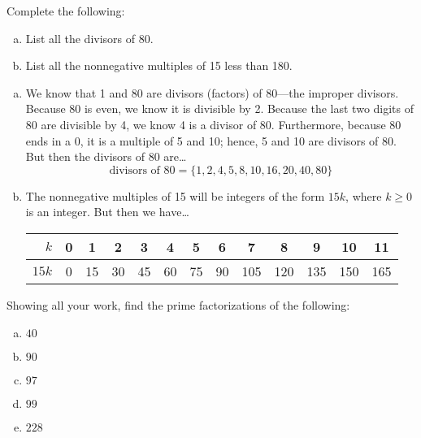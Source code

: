 \documentclass[11pt,letterpaper]{article}
\begin{document}

 Complete the following:
	\begin{enumerate}[(a)]
	\item List all the divisors of 80.
	\item List all the nonnegative multiples of 15 less than 180. 
	\end{enumerate} \pspace

\sol 
\begin{enumerate}[(a)]
\item We know that 1 and 80 are divisors (factors) of 80---the improper divisors. Because 80 is even, we know it is divisible by 2. Because the last two digits of 80 are divisible by 4, we know 4 is a divisor of 80. Furthermore, because 80 ends in a 0, it is a multiple of 5 and 10; hence, 5 and 10 are divisors of 80. But then the divisors of 80 are\dots
	\[
	\text{divisors of 80}= \{ 1, 2, 4, 5, 8, 10, 16, 20, 40, 80 \}
	\] \pspace

\item The nonnegative multiples of 15 will be integers of the form $15k$, where $k \geq 0$ is an integer. But then we have\dots \par
	\begin{table}[h]
	\centering
	\begin{tabular}{r|cccccccccccc}
	$k$ & 0 & 1 & 2 & 3 & 4 & 5 & 6 & 7 & 8 & 9 & 10 & 11 \\ \hline
	$15k$ & 0 & 15 & 30 & 45 & 60 & 75 & 90 & 105 & 120 & 135 & 150 & 165
	\end{tabular}
	\end{table} \par
\end{enumerate}



\newpage



 Showing all your work, find the prime factorizations of the following:
	\begin{enumerate}[(a)]
	\item $40$
	\item $90$
	\item $97$
	\item $99$
	\item $228$
	\end{enumerate} \pspace
\end{document}
